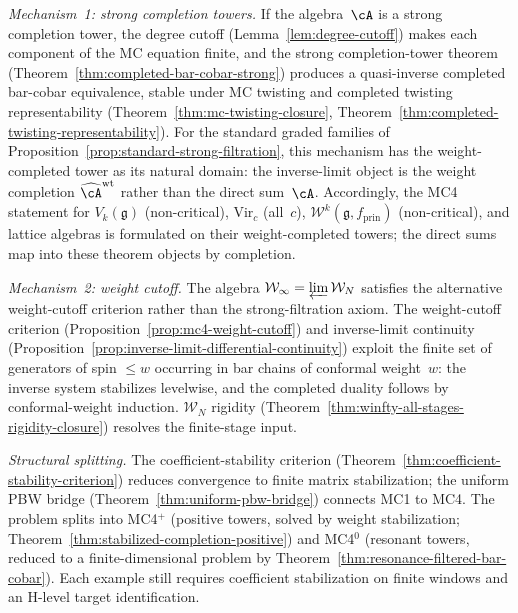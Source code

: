 \smallskip
\noindent\emph{Mechanism~1: strong completion towers.}
If the algebra~$\cA$ is a strong completion tower, the degree cutoff
\textup{(}Lemma~\ref{lem:degree-cutoff}\textup{)} makes each component
of the MC equation finite, and the strong completion-tower theorem
\textup{(}Theorem~\ref{thm:completed-bar-cobar-strong}\textup{)}
produces a quasi-inverse completed bar-cobar equivalence, stable under
MC twisting and completed twisting representability
\textup{(}Theorem~\ref{thm:mc-twisting-closure},
Theorem~\ref{thm:completed-twisting-representability}\textup{)}.
For the standard graded families of
Proposition~\ref{prop:standard-strong-filtration}, this mechanism
has the weight-completed tower as its natural domain: the
inverse-limit object is the weight completion
$\widehat{\cA}^{\mathrm{wt}}$ rather than the direct sum~$\cA$.
Accordingly, the MC4 statement for $V_k(\mathfrak g)$
\textup{(}non-critical\textup{)}, $\mathrm{Vir}_c$ \textup{(}all~$c$\textup{)},
$\mathcal{W}^k(\mathfrak g, f_{\mathrm{prin}})$
\textup{(}non-critical\textup{)}, and lattice algebras is formulated on
their weight-completed towers; the direct sums map into these theorem
objects by completion.

\smallskip
\noindent\emph{Mechanism~2: weight cutoff.}
The algebra $\mathcal{W}_\infty = \varprojlim \mathcal{W}_N$ satisfies
the alternative weight-cutoff criterion rather than the
strong-filtration axiom. The weight-cutoff
criterion \textup{(}Proposition~\ref{prop:mc4-weight-cutoff}\textup{)}
and inverse-limit continuity
\textup{(}Proposition~\ref{prop:inverse-limit-differential-continuity}\textup{)}
exploit the finite set of generators of spin $\leq w$ occurring in
bar chains of conformal weight~$w$: the inverse system stabilizes levelwise,
and the completed duality follows by conformal-weight induction.
$\mathcal{W}_N$ rigidity
\textup{(}Theorem~\ref{thm:winfty-all-stages-rigidity-closure}\textup{)}
resolves the finite-stage input.

\smallskip
\noindent\emph{Structural splitting.}
The coefficient-stability criterion (Theorem~\ref{thm:coefficient-stability-criterion}) reduces convergence to finite matrix stabilization; the uniform PBW bridge (Theorem~\ref{thm:uniform-pbw-bridge}) connects MC1 to MC4. The problem splits into MC4$^+$ (positive towers, solved by weight stabilization; Theorem~\ref{thm:stabilized-completion-positive}) and MC4$^0$ (resonant towers, reduced to a finite-dimensional problem by Theorem~\ref{thm:resonance-filtered-bar-cobar}). Each example still requires coefficient stabilization on finite windows and an H-level target identification.

